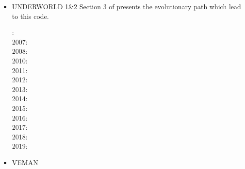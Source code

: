 \begin{itemize}
{\small
\noindent
\cite{sato12}
\cite{toyd13}
\cite{tosn15}
\cite{tomy16}
}

\item {\codefont UNDERWORLD 1\&2} 
Section 3 of \cite{qums07} presents the evolutionary path which lead to this code.

{\small
{}: \cite{stfs06}\cite{momu06}\\
2007: \cite{moql07}\cite{stfs07}\cite{qums07}\\
2008: \cite{lemm08}\cite{ozrs08}\cite{gotc08}\cite{stmt08}\cite{scsf11}\\
2010: \cite{casm10}\cite{mamb10}\cite{stsf10}\cite{stfc10}\cite{fasm10}\cite{cazf10}\\
2011: \cite{memm11}\cite{cafz11}\\
2012: \cite{cafa12}\\
2013: \cite{bemm12}\cite{scmo13}\cite{faca13}\cite{care13}\cite{coml13}\\
2014: \cite{famc14}\cite{shjm14}\\
2015: \cite{quxm15}\cite{bemm15}\cite{scsp15}\cite{shmj15}\\
2016: \cite{shmv16}\cite{onlw16}\cite{kicf16}\\
2017: \cite{bems17}\cite{kicf17}\cite{sche17}\cite{wakc17}\\
2018: \cite{memm18}\cite{yamz18}\cite{bemc18}\cite{mord18}\\
2019: \cite{samo19}\cite{yamg19}\cite{canc19}\cite{cakc19}\cite{sams19b}\cite{bore19}
}

\item {\codefont VEMAN}

{\small
\noindent
\cite{bepo10}
}

\end{itemize}

